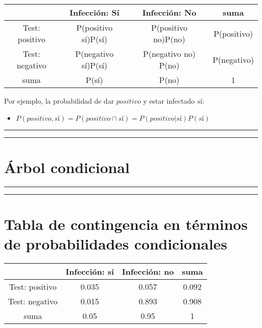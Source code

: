 \documentclass[
]{book}
\providecommand{\tightlist}{%
  \setlength{\itemsep}{0pt}\setlength{\parskip}{0pt}}
\begin{document}
\begin{longtable}[]{@{}cccc@{}}
\toprule
& Infección: Sí & Infección: No & suma \\
\midrule
\endhead
Test: positivo & P(positivo {\textbar{}} sí)P(sí) & P(positivo {\textbar{}} no)P(no) & P(positivo) \\
Test: negativo & P(negativo {\textbar{}} sí)P(sí) & P(negativo {\textbar{}} no) P(no) & P(negativo) \\
suma & P(sí) & P(no) & 1 \\
\bottomrule
\end{longtable}

Por ejemplo, la probabilidad de dar \(positivo\) y estar infectado \(sí\):

\begin{itemize}
\tightlist
\item
  \(P(positivo, sí)=P(positivo \cap sí) = P(positivo|sí) P(sí)\)
\end{itemize}

\begin{center}\rule{0.5\linewidth}{0.5pt}\end{center}

\begin{center}\rule{0.5\linewidth}{0.5pt}\end{center}

\hypertarget{uxe1rbol-condicional}{%
\section{Árbol condicional}\label{uxe1rbol-condicional}}

\begin{center}\rule{0.5\linewidth}{0.5pt}\end{center}

\begin{center}\rule{0.5\linewidth}{0.5pt}\end{center}

\hypertarget{tabla-de-contingencia-en-tuxe9rminos-de-probabilidades-condicionales-1}{%
\section{Tabla de contingencia en términos de probabilidades condicionales}\label{tabla-de-contingencia-en-tuxe9rminos-de-probabilidades-condicionales-1}}

\begin{longtable}[]{@{}cccc@{}}
\toprule
& Infección: sí & Infección: no & suma \\
\midrule
\endhead
Test: positivo & 0.035 & 0.057 & 0.092 \\
Test: negativo & 0.015 & 0.893 & 0.908 \\
suma & 0.05 & 0.95 & 1 \\
\bottomrule
\end{longtable}
\end{document}
